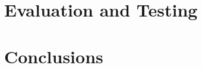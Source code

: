 \documentclass[a4paper, 11pt]{article}
\begin{document}
\section{Evaluation and Testing} %

\section{Conclusions} %
%
%
\end{document}
